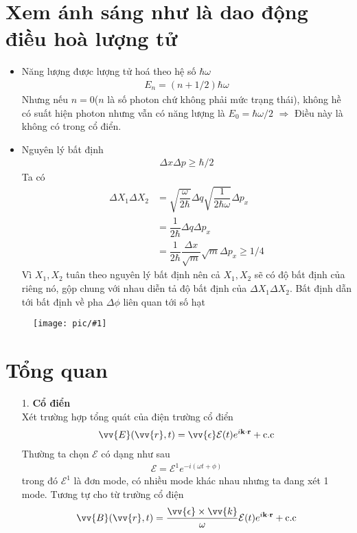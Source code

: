\documentclass{report}
\newcommand{\image}[1]{
\begin{figure}[H]
	\centering
	\texttt{[image: pic/\#1]}
	\label{#1}
\end{figure}
}
\newcommand{\f}[2]{\dfrac{#1}{#2}}
\begin{document}
\section{Xem ánh sáng như là dao động điều hoà lượng tử}
\begin{itemize}
	\item Năng lượng được lượng tử hoá theo hệ số $\hbar \omega$ 
	\begin{gather}
		E_{n} = \left(n + 1/2\right) \hbar \omega
	\end{gather}
	Nhưng nếu $n = 0$($n$ là số photon chứ không phải mức trạng thái), không hề có suất hiện photon nhưng vẫn có năng lượng là $E_{0} = \hbar \omega /2$ $\Rightarrow$ Điều này là không có trong cổ điển.
	\item Nguyên lý bất định
	\begin{gather}
		\Delta x \Delta p \geq \hbar /2
	\end{gather}
	Ta có
	\begin{equation}
		\begin{aligned}
			\Delta X_{1} \Delta X_{2}
			&= \sqrt{\f{\omega}{2 \hbar}} \Delta q \sqrt{\f{1}{2 \hbar \omega}} \Delta p_{x} \\
			&= \f{1}{2 \hbar} \Delta q \Delta p_{x}\\
			&= \f{1}{2 \hbar} \f{\Delta x}{\sqrt{m}} \sqrt{m} \Delta p_{x} \geq 1/4
		\end{aligned}
	\end{equation}
	Vì $X_{1},X_{2}$ tuân theo nguyên lý bất định nên cả $X_{1},X_{2}$ sẽ có độ bất định của riêng nó, gộp chung với nhau diễn tả độ bất định của $\Delta X_{1} \Delta X_{2}$. Bất định dẫn tới bất định về pha $\Delta \phi$ liên quan tới số hạt 
\end{itemize}
\image{phaseUncer.png}
\section{Tổng quan}
\begin{enumerate}
	\item[1.] \textbf{Cổ điển}\\
	Xét trường hợp tổng quát của điện trường cổ điển
	\begin{gather}
		\vv{E}(\vv{r},t) = \vv{\epsilon} \mathcal{E}(t) e^{i \mathbf{k \cdot r}} + \text{c.c}
	\end{gather}
	Thường ta chọn $\mathcal{E}$ có dạng như sau
	\begin{gather}
		\mathcal{E} = \mathcal{E}^{1} e^{-i (\omega t + \phi)}
	\end{gather}
	trong đó $\mathcal{E}^{1}$ là đơn mode, có nhiều mode khác nhau nhưng ta đang xét 1 mode. Tương tự cho từ trường cổ điện
	\begin{gather}
		\vv{B}(\vv{r},t) = \f{\vv{\epsilon} \times \vv{k}}{\omega} \mathcal{E}(t) e^{i \mathbf{k \cdot r}} + \text{c.c}
	\end{gather}
\end{enumerate}
\end{document}

